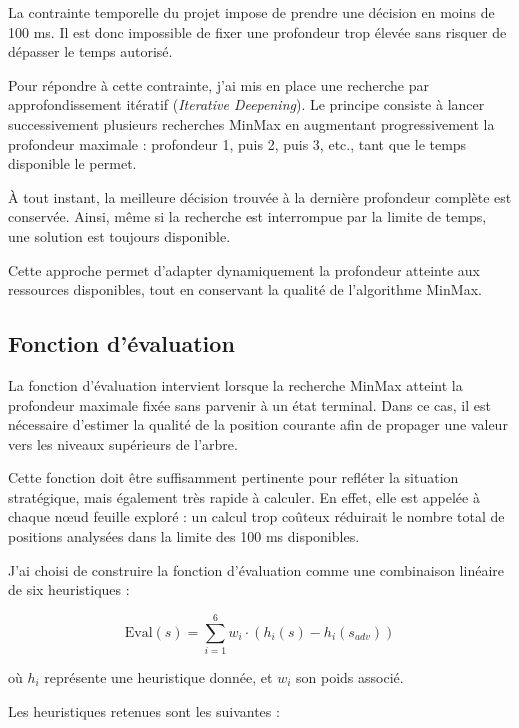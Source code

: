 \documentclass[11pt,a4paper]{article}
\begin{document}
La contrainte temporelle du projet impose de prendre une décision en moins de 100 ms. Il est donc impossible de fixer une profondeur
trop élevée sans risquer de dépasser le temps autorisé.

Pour répondre à cette contrainte, j'ai mis en place une recherche par approfondissement itératif (\textit{Iterative Deepening}). 
Le principe consiste à lancer successivement plusieurs recherches MinMax en augmentant progressivement la profondeur maximale :
profondeur 1, puis 2, puis 3, etc., tant que le temps disponible le permet.

À tout instant, la meilleure décision trouvée à la dernière profondeur complète est conservée. Ainsi, même si la recherche est
interrompue par la limite de temps, une solution est toujours disponible.

Cette approche permet d'adapter dynamiquement la profondeur atteinte aux ressources disponibles, tout en conservant la qualité de
l'algorithme MinMax.

\subsection{Fonction d'évaluation}

La fonction d'évaluation intervient lorsque la recherche MinMax atteint la profondeur maximale fixée sans parvenir à un état
terminal. Dans ce cas, il est nécessaire d'estimer la qualité de la position courante afin de propager une valeur vers les niveaux
supérieurs de l'arbre.

Cette fonction doit être suffisamment pertinente pour refléter la situation stratégique, mais également très rapide à calculer.
En effet, elle est appelée à chaque nœud feuille exploré : un calcul trop coûteux réduirait le nombre total de positions analysées
dans la limite des 100 ms disponibles.

J'ai choisi de construire la fonction d'évaluation comme une combinaison linéaire de six heuristiques :

\[
\text{Eval}(s) = \sum_{i=1}^{6} w_i \cdot \left( h_i(s) - h_i(s_{adv}) \right)
\]

où $h_i$ représente une heuristique donnée, et $w_i$ son poids associé.

Les heuristiques retenues sont les suivantes :
\end{document}
